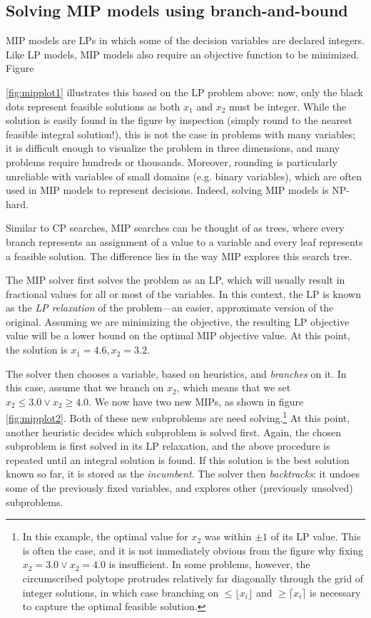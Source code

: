 \documentclass[13pt, letterpaper, oneside]{book}
\begin{document}
\subsection{Solving MIP models using branch-and-bound}
MIP models are LPs in which some of the decision variables are declared
integers. Like LP models, MIP models also require an
objective function to be minimized. Figure

\ref{fig:mipplot1} illustrates this based on the LP problem above: now, only the
black dots represent feasible solutions as both $x_1$ and $x_2$ must be integer. While the solution is easily found in
the figure by inspection (simply round to the nearest feasible integral
solution!), this is not the case in problems with many variables; it is
difficult enough to visualize the problem in three dimensions, and many problems
require hundreds or thousands. Moreover, rounding is particularly unreliable 
with variables of small domains (e.g. binary variables), which are often used in
MIP models to represent decisions. Indeed, solving MIP models is NP-hard.

Similar to CP searches, MIP searches can be thought of as trees, where every
branch represents an assignment of a value to a variable and every leaf represents
a feasible solution. The difference lies in the way MIP explores this search tree.

The MIP solver first solves the problem as an LP, which will usually result in
fractional values for all or most of the variables. In this context, the LP is
known as the \textit{LP relaxation} of the problem---an easier, approximate
version of the original. Assuming we are minimizing the objective, the resulting
LP objective value will be a lower bound on the optimal MIP objective value.
At this point, the solution is $x_1 = 4.6, x_2 = 3.2$.

The solver then chooses a variable, based on heuristics, and \textit{branches}
on it. In this case, assume that we branch on $x_2$, which means that we set
$x_2 \leq 3.0 \lor x_2 \geq 4.0$. We now have two new MIPs, as shown in figure
\ref{fig:mipplot2}. Both of these new subproblems are need solving.\footnote{In
this example, the optimal value for $x_2$ was
within $\pm1$ of its LP value.  This is often the case, and it is not
immediately obvious from the figure why fixing $x_2 = 3.0 \lor x_2 = 4.0$ is
insufficient. In some problems, however, the circumscribed polytope protrudes
relatively far diagonally through the grid of integer solutions, in which case
branching on $\leq \lfloor x_i \rfloor$ and $\geq \lceil x_i \rceil$ is
necessary to capture the optimal feasible solution.} At
this point, another heuristic decides which subproblem is solved first.
Again, the chosen subproblem is first solved in its LP relaxation, and the above
procedure is repeated until an integral solution is found. If this solution is
the best solution known so far, it is stored as the \textit{incumbent}. The
solver then \textit{backtracks}: it undoes some of the previously fixed variables,
and explores other (previously unsolved) subproblems.
\end{document}
